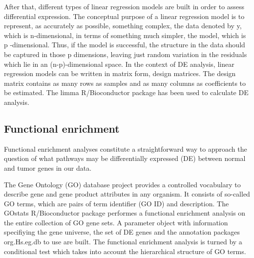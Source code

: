 \documentclass[9pt,twocolumn,twoside]{gsajnl}
\begin{document}
After that, different types of linear regression models are built in order to assess differential expression. The conceptual purpose of a linear regression model is to represent, as accurately as possible, something complex, the data denoted by y, which is n-dimensional, in terms of something much simpler, the model, which is p -dimensional. Thus, if the model is successful, the structure in the data should be captured in those p dimensions, leaving just random variation in the residuals which lie in an (n-p)-dimensional space. In the context of DE analysis, linear regression models can be written in matrix form, design matrices. The design matrix contains as many rows as samples and as many columns as coefficients to be estimated. The limma \citep{Ritchie2015} R/Bioconductor package has been used to calculate DE analysis.


\subsection*{Functional enrichment}
Functional enrichment analyses constitute a straightforward way to approach the question of what pathways may be differentially expressed (DE) between normal and tumor genes in our data.

The Gene Ontology (GO) database project provides a controlled vocabulary to describe gene and gene product attributes in any organism. It consists of so-called GO terms, which are pairs of term identifier (GO ID) and description. The GOstats \citep{Falcon2007} R/Bioconductor package performes a functional enrichment analysis on the entire collection of GO gene sets. A parameter object with information specifiying the gene universe, the set of DE genes and the annotation packages org.Hs.eg.db \citep{org.Hs.eg.db} to use are built. The functional enrichment analysis is turned by a conditional test which takes into account the hierarchical structure of GO terms.


\end{document}
